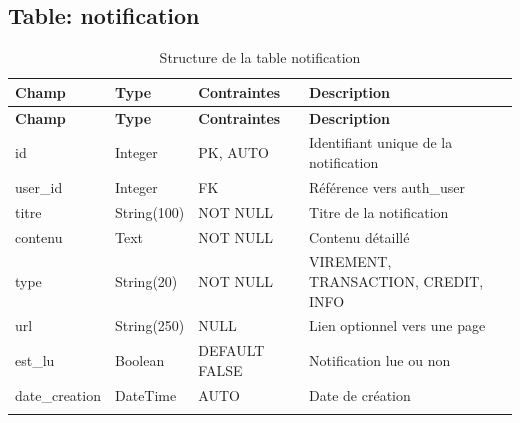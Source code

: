 \documentclass[12pt,a4paper]{report}
\begin{document}
\subsection{Table: notification}
\begin{longtable}{|p{3.5cm}|p{2.5cm}|p{2cm}|p{6cm}|}
\hline
\rowcolor{banquiseblue!30}
\textbf{Champ} & \textbf{Type} & \textbf{Contraintes} & \textbf{Description} \\
\hline
\endfirsthead
\hline
\rowcolor{banquiseblue!30}
\textbf{Champ} & \textbf{Type} & \textbf{Contraintes} & \textbf{Description} \\
\hline
\endhead

id & Integer & PK, AUTO & Identifiant unique de la notification \\
\hline
user\_id & Integer & FK & Référence vers auth\_user \\
\hline
titre & String(100) & NOT NULL & Titre de la notification \\
\hline
contenu & Text & NOT NULL & Contenu détaillé \\
\hline
type & String(20) & NOT NULL & VIREMENT, TRANSACTION, CREDIT, INFO \\
\hline
url & String(250) & NULL & Lien optionnel vers une page \\
\hline
est\_lu & Boolean & DEFAULT FALSE & Notification lue ou non \\
\hline
date\_creation & DateTime & AUTO & Date de création \\
\hline

\caption{Structure de la table notification}
\end{longtable}
\end{document}
